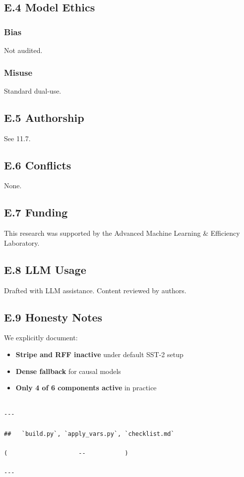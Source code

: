 \subsection{E.4 Model Ethics}

\subsubsection{Bias}
Not audited.

\subsubsection{Misuse}
Standard dual-use.

\subsection{E.5 Authorship}

See  11.7.

\subsection{E.6 Conflicts}

None.

\subsection{E.7 Funding}

This research was supported by the Advanced Machine Learning & Efficiency Laboratory.

\subsection{E.8 LLM Usage}

Drafted with LLM assistance. Content reviewed by authors.

\subsection{E.9 Honesty Notes}

We explicitly document:
\begin{itemize}
\item \textbf{Stripe and RFF inactive} under default SST-2 setup
\item \textbf{Dense fallback} for causal models
\item \textbf{Only 4 of 6 components active} in practice
\end{itemize}
\begin{lstlisting}

---

##   `build.py`, `apply_vars.py`, `checklist.md`

(                    --           )

---
\end{lstlisting}